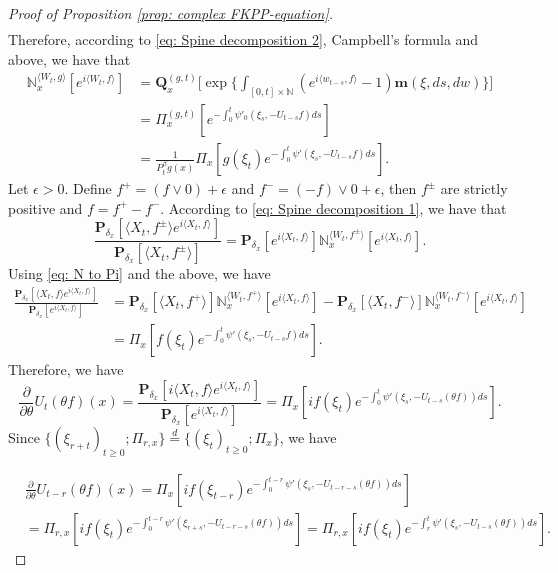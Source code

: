 \documentclass[UTF8]{pkuthss}
\theoremstyle{plain}
\theoremstyle{definition}
\numberwithin{equation}{section}
\begin{document}
\begin{proof}[Proof of Proposition \ref{prop: complex FKPP-equation}]
\begin{align}
\end{align}
    Therefore, according to \eqref{eq: Spine decomposition 2}, Campbell's formula and above, we have that
\begin{align}
\label{eq: N to Pi}
    \mathbb N_x^{\langle W_{t}, g\rangle}[e^{i \langle W_t, f\rangle}]
    &=\mathbf Q_x^{(g,t)} \Big[\exp\Big\{\int_{[0,t]\times \mathbb N}(e^{i \langle w_{t-s}, f\rangle} - 1) \mathbf m(\xi, ds,dw)\Big\}\Big]
    \\&= \Pi_x^{(g,t)} [e^{-\int_0^t \psi'_0(\xi_s, -U_{t-s}f)ds}]
    \\&= \frac{1}{P_t^{\beta} g (x)} \Pi_x[ g(\xi_t) e^{-\int_0^t \psi'(\xi_s, -U_{t-s}f)ds} ].
\end{align}
    Let $\epsilon >0$.
    Define $f^+ = (f \vee 0) + \epsilon$ and $f^- = (-f) \vee 0 + \epsilon$, then $f^\pm$ are strictly positive and $f = f^+ - f^-$.
    According to \eqref{eq: Spine decomposition 1}, we have that
\begin{equation}
    \frac{\mathbf P_{\delta_x}[\langle X_t,f^{\pm}\rangle e^{i \langle X_t,f\rangle}]}{\mathbf P_{\delta_x}[\langle X_t,f^{\pm}\rangle ]}
    = \mathbf P_{\delta_x}[e^{i \langle X_t,f\rangle}] \mathbb N_x^{\langle W_t,f^{\pm}\rangle}[e^{i \langle X_t,f\rangle}].
\end{equation}
    Using \eqref{eq: N to Pi} and the above, we have
\begin{align}
    \frac{\mathbf P_{\delta_x}[\langle X_t, f\rangle e^{i \langle X_t, f\rangle}] }{\mathbf P_{\delta_x}[e^{i \langle X_t, f\rangle}]}
    &= \mathbf P_{\delta_x}[\langle X_t, f^+\rangle] \mathbb N_x^{\langle W_t, f^+\rangle} [e^{i \langle X_t, f\rangle}] - \mathbf P_{\delta_x}[\langle X_t, f^-\rangle]\mathbb N_x^{\langle W_t, f^-\rangle}[e^{i \langle X_t, f\rangle}]
    \\& = \Pi_x[ f(\xi_t) e^{- \int_0^t \psi'(\xi_s, -U_{t-s}f) ds}  ].
\end{align}
    Therefore, we have
\begin{equation}
    \frac{\partial}{\partial \theta} {U_t(\theta f)(x)}
    = \frac{\mathbf P_{\delta_x}[i\langle X_t, f\rangle e^{i \langle X_t, f\rangle}] }{\mathbf P_{\delta_x}[e^{i \langle X_t, f\rangle}]}
    =  \Pi_x[ if(\xi_t) e^{ - \int_0^t \psi'(\xi_s, -U_{t-s}(\theta f)) ds} ].
\end{equation}
    Since $\{(\xi_{r+t})_{t \geq 0}; \Pi_{r,x}\} \overset{d}{=} \{(\xi_{t})_{t\geq 0}; \Pi_{x}\} $, we have

\begin{align}
    &\frac{\partial}{\partial \theta} U_{t-r}(\theta f)( x)
    = \Pi_x[ i f(\xi_{t-r}) e^{-\int_0^{t-r} \psi'(\xi_s, -U_{t-r-s}(\theta f)) ds} ]
    \\&= \Pi_{r,x}[i f(\xi_t)e^{-\int_0^{t-r} \psi'(\xi_{r+s}, -U_{t-r-s}(\theta f)) ds} ]
    = \Pi_{r,x}[if(\xi_t)e^{-\int_r^t \psi'(\xi_{s}, -U_{t-s}(\theta f)) ds} ].
\end{align}


\end{proof}
\end{document}
